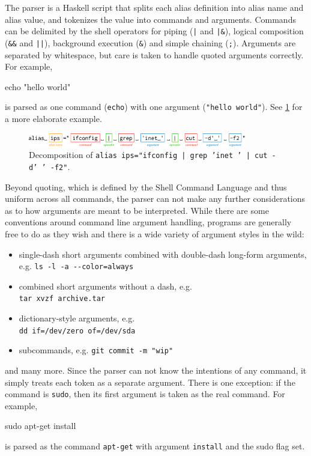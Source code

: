 The parser is a Haskell script that splits each alias definition into alias name and alias value, and tokenizes the value into commands and arguments.
Commands can be delimited by the shell operators for piping (\verb!|! and \verb!|&!), logical composition (\verb|&&| and \verb!||!), background execution (\verb|&|) and simple chaining (\verb|;|).
Arguments are separated by whitespace, but care is taken to handle quoted arguments correctly. 
For example, 
\begin{CVerbatim}
echo "hello world"
\end{CVerbatim}
is parsed as one command (\texttt{echo}) with one argument (\texttt{"hello world"}).
See \cref{fig:parser} for a more elaborate example.

\begin{figure}
    \centering
    \includegraphics[width=0.85\textwidth]{parser_breakdown.pdf}
    \caption{Decomposition of \texttt{alias ips="ifconfig | grep 'inet ' | cut -d' ' -f2"}.}
    \label{fig:parser}
\end{figure}

Beyond quoting, which is defined by the Shell Command Language and thus uniform across all commands, the parser can not make any further considerations as to how arguments are meant to be interpreted.
While there are some conventions around command line argument handling, programs are generally free to do as they wish and there is a wide variety of argument styles in the wild:
\begin{itemize}
    \item single-dash short arguments combined with double-dash long-form arguments, e.g. \verb|ls -l -a --color=always|
    \item combined short arguments without a dash, e.g. \\ \verb|tar xvzf archive.tar|
    \item dictionary-style arguments, e.g. \\ \verb|dd if=/dev/zero of=/dev/sda|
    \item subcommands, e.g. \verb|git commit -m "wip"|
\end{itemize}
and many more.
Since the parser can not know the intentions of any command, it simply treats each token as a separate argument.
There is one exception: if the command is \texttt{sudo}, then its first argument is taken as the real command. 
For example,
\begin{CVerbatim}
sudo apt-get install
\end{CVerbatim} 
is parsed as the command \texttt{apt-get} with argument \texttt{install} and the sudo flag set.

